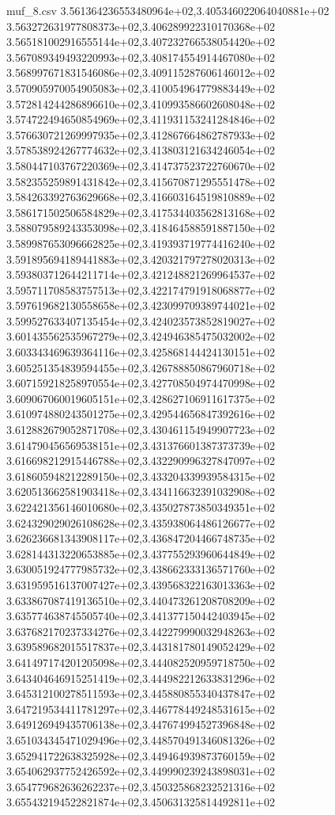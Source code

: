 \begin{filecontents*}{muf_8.csv}
3.561364236553480964e+02,3.405346022064040881e+02
3.563272631977808373e+02,3.406289922310170368e+02
3.565181002916555144e+02,3.407232766538054420e+02
3.567089349493220993e+02,3.408174554914467080e+02
3.568997671831546086e+02,3.409115287606146012e+02
3.570905970054905083e+02,3.410054964779883449e+02
3.572814244286896610e+02,3.410993586602608048e+02
3.574722494650854969e+02,3.411931153241284846e+02
3.576630721269997935e+02,3.412867664862787933e+02
3.578538924267774632e+02,3.413803121634246054e+02
3.580447103767220369e+02,3.414737523722760670e+02
3.582355259891431842e+02,3.415670871295551478e+02
3.584263392763629668e+02,3.416603164519810889e+02
3.586171502506584829e+02,3.417534403562813168e+02
3.588079589243353098e+02,3.418464588591887150e+02
3.589987653096662825e+02,3.419393719774416240e+02
3.591895694189441883e+02,3.420321797278020313e+02
3.593803712644211714e+02,3.421248821269964537e+02
3.595711708583757513e+02,3.422174791918068877e+02
3.597619682130558658e+02,3.423099709389744021e+02
3.599527633407135454e+02,3.424023573852819027e+02
3.601435562535967279e+02,3.424946385475032002e+02
3.603343469639364116e+02,3.425868144424130151e+02
3.605251354839594455e+02,3.426788850867960718e+02
3.607159218258970554e+02,3.427708504974470998e+02
3.609067060019605151e+02,3.428627106911617375e+02
3.610974880243501275e+02,3.429544656847392616e+02
3.612882679052871708e+02,3.430461154949907723e+02
3.614790456569538151e+02,3.431376601387373739e+02
3.616698212915446788e+02,3.432290996327847097e+02
3.618605948212289150e+02,3.433204339939584315e+02
3.620513662581903418e+02,3.434116632391032908e+02
3.622421356146010680e+02,3.435027873850349351e+02
3.624329029026108628e+02,3.435938064486126677e+02
3.626236681343908117e+02,3.436847204466748735e+02
3.628144313220653885e+02,3.437755293960644849e+02
3.630051924777985732e+02,3.438662333136571760e+02
3.631959516137007427e+02,3.439568322163013363e+02
3.633867087419136510e+02,3.440473261208708209e+02
3.635774638745505740e+02,3.441377150442403945e+02
3.637682170237334276e+02,3.442279990032948263e+02
3.639589682015517837e+02,3.443181780149052429e+02
3.641497174201205098e+02,3.444082520959718750e+02
3.643404646915251419e+02,3.444982212633831296e+02
3.645312100278511593e+02,3.445880855340437847e+02
3.647219534411781297e+02,3.446778449248531615e+02
3.649126949435706138e+02,3.447674994527396848e+02
3.651034345471029496e+02,3.448570491346081326e+02
3.652941722638325928e+02,3.449464939873760159e+02
3.654062937752426592e+02,3.449990239243898031e+02
3.654779682636262237e+02,3.450325868232521316e+02
3.655432194522821874e+02,3.450631325814492811e+02

\end{filecontents*}
